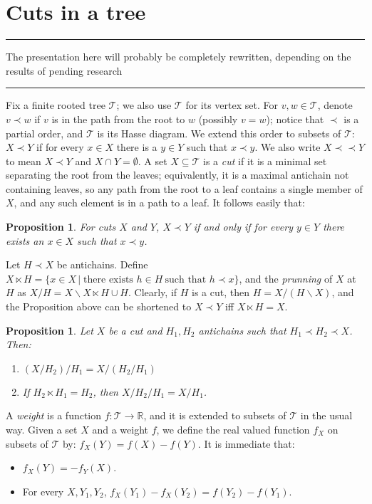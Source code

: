 \documentclass[12pt]{article}
\newtheorem{pro}[lem]{Proposition}
\newenvironment{Muse}%
{\vspace{1em}%
\begin{minipage}{12cm}
\rule{12cm}{1pt}\sffamily\noindent}%
{\newline\rule{12cm}{1pt}
\end{minipage}%
 \vspace{1em}}
\newcommand{\R}{\ensuremath{\mathbb{R}}\xspace}
\newcommand{\T}{\ensuremath{\mathcal{T}}\xspace}
\newcommand{\conj}[2]{\ensuremath{\{#1\,|\;#2\}}}
\newcommand{\bip}{\prec\!\!\prec}
\newcommand{\lt}[2]{\ensuremath{#1\!\!\ltimes\!\!#2}}
\begin{document}
\section{Cuts in a tree}\label{sec:cuts-tree}
\begin{Muse}
The presentation here will probably be completely
rewritten, depending on the results of pending research  
\end{Muse}

Fix a finite rooted tree \T; we also use \T for its vertex set.  For
\(v,w\in\T\), denote \(v\prec w\) if \(v\) is in the path from the root to
\(w\) (possibly \(v=w\)); notice that \(\prec\) is a partial order, and \T is
its Hasse diagram.  We extend this order to subsets of \T: \(X\prec Y\) if for
every \(x\in X\) there is a \(y\in Y\) such that \(x\prec y\).  We also write
\(X\bip Y\) to mean \(X\prec Y\) and \(X\cap Y=\emptyset\).  A set
\(X\subseteq\T\) is a \emph{cut} if it is a minimal set separating the root
from the leaves; equivalently, it is a maximal antichain not containing
leaves, so any path from the root to a leaf contains a single member of \(X\),
and any such element is in a path to a leaf.  It follows easily that:

\begin{pro}
  For cuts \(X\) and \(Y\),  \(X\prec Y\) if and only if for every
  \(y\in Y\) there exists an \(x\in X\) such that \(x\prec y\).
\end{pro}

Let \(H\prec X\) be antichains.  Define
\(\lt{X}{H} = \conj{x \in
  X}{\text{there exists\ }h\in H\ \text{such that\ } h\prec x}\), and the
\emph{prunning} of \(X\) at \(H\) as \(X/H = X\backslash \lt{X}{H} \cup H\).
Clearly, if \(H\) is a cut, then \(H = X/ (H\backslash X)\), and the
Proposition above can be shortened to \(X\prec Y\) iff \(\lt{X}{H}=X\).

\begin{pro}
  Let \(X\) be a cut and \(H_1, H_2\) antichains such that
  \(H_1\prec H_2\prec X\). Then:
  \begin{enumerate}
      \item \((X/H_2)/H_1= X/(H_2/H_1)\)
      \item If \(\lt{H_2}{H_1}=H_2\), then \(X/H_2/H_1=X/H_1\).
  \end{enumerate}
\end{pro}

A \emph{weight} is a function \(f:\T\rightarrow\R\), and it is extended to
subsets of \T in the usual way.  Given a set \(X\) and a weight \(f\), we
define the real valued function \(f_X\) on subsets of \T by:
\(f_X(Y)=f(X)-f(Y)\).  It is immediate that:
\begin{itemize}
    \item \(f_X(Y)=-f_Y(X)\).
    \item For every \(X,Y_1,Y_2\), \(f_X(Y_1)-f_X(Y_2)= f(Y_2)-f(Y_1)\).
\end{itemize}
\end{document}
